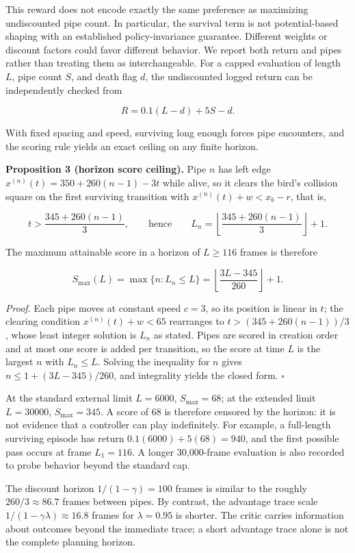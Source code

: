 \documentclass[
  11pt,
]{article}
\begin{document}
This reward does not encode exactly the same preference as maximizing
undiscounted pipe count. In particular, the survival term is not
potential-based shaping with an established policy-invariance guarantee.
Different weights or discount factors could favor different behavior. We
report both return and pipes rather than treating them as
interchangeable. For a capped evaluation of length \(L\), pipe count
\(S\), and death flag \(d\), the undiscounted logged return can be
independently checked from

\[
R=0.1(L-d)+5S-d.
\]

With fixed spacing and speed, surviving long enough forces pipe
encounters, and the scoring rule yields an exact ceiling on any finite
horizon.

\textbf{Proposition 3 (horizon score ceiling).} Pipe \(n\) has left edge
\(x^{(n)}(t)=350+260(n-1)-3t\) while alive, so it clears the bird's
collision square on the first surviving transition with
\(x^{(n)}(t)+w<x_b-r\), that is,

\[
t>\frac{345+260(n-1)}{3},
\qquad\text{hence}\qquad
L_n=\left\lfloor\frac{345+260(n-1)}{3}\right\rfloor+1 .
\]

The maximum attainable score in a horizon of \(L\ge116\) frames is
therefore

\[
S_{\max}(L)=\max\{n: L_n\le L\}=\left\lfloor\frac{3L-345}{260}\right\rfloor+1 .
\]

\emph{Proof.} Each pipe moves at constant speed \(c=3\), so its position
is linear in \(t\); the clearing condition \(x^{(n)}(t)+w<65\)
rearranges to \(t>(345+260(n-1))/3\), whose least integer solution is
\(L_n\) as stated. Pipes are scored in creation order and at most one
score is added per transition, so the score at time \(L\) is the largest
\(n\) with \(L_n\le L\). Solving the inequality for \(n\) gives
\(n\le1+(3L-345)/260\), and integrality yields the closed form.
\(\square\)

At the standard external limit \(L=6000\), \(S_{\max}=68\); at the
extended limit \(L=30000\), \(S_{\max}=345\). A score of 68 is therefore
censored by the horizon: it is not evidence that a controller can play
indefinitely. For example, a full-length surviving episode has return
\(0.1(6000)+5(68)=940\), and the first possible pass occurs at frame
\(L_1=116\). A longer 30,000-frame evaluation is also recorded to probe
behavior beyond the standard cap.

The discount horizon \(1/(1-\gamma)=100\) frames is similar to the
roughly \(260/3\approx86.7\) frames between pipes. By contrast, the
advantage trace scale \(1/(1-\gamma\lambda)\approx16.8\) frames for
\(\lambda=0.95\) is shorter. The critic carries information about
outcomes beyond the immediate trace; a short advantage trace alone is
not the complete planning horizon.
\end{document}
